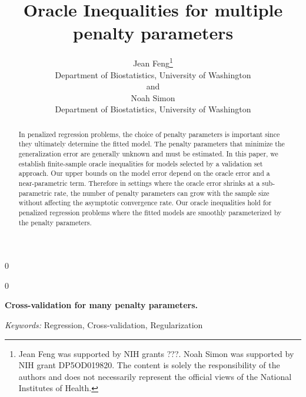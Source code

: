 \documentclass[12pt]{article}
\newcommand{\blind}{0}
\begin{document}
\def\spacingset#1{\renewcommand{\baselinestretch}%
{#1}\small\normalsize} \spacingset{1}



\blind
{
  \title{\bf Oracle Inequalities for multiple penalty parameters}
  \author{Jean Feng\thanks{
    Jean Feng was supported by NIH grants ???. %
    Noah Simon was supported by NIH grant DP5OD019820.
    The content is solely the responsibility of the authors and does not necessarily represent the official views of the National Institutes of Health.}\\
    Department of Biostatistics, University of Washington\\
    and \\
    Noah Simon \\
    Department of Biostatistics, University of Washington}
  \maketitle
} \fi

\blind
{
  \bigskip
  \bigskip
  \bigskip
  \begin{center}
    {\LARGE\bf Cross-validation for many penalty parameters.}
\end{center}
  \medskip
} \fi

\bigskip
\begin{abstract}

In penalized regression problems, the choice of penalty parameters is important since they ultimately determine the fitted model. The penalty parameters that minimize the generalization error are generally unknown and must be estimated. In this paper, we establish finite-sample oracle inequalities for models selected by a validation set approach. Our upper bounds on the model error depend on the oracle error and a near-parametric term. Therefore in settings where the oracle error shrinks at a sub-parametric rate, the number of penalty parameters can grow with the sample size without affecting the asymptotic convergence rate. Our oracle inequalities hold for penalized regression problems where the fitted models are smoothly parameterized by the penalty parameters. 

\end{abstract}

\noindent%
{\it Keywords:}  Regression, Cross-validation, Regularization
\vfill

\newpage
\spacingset{1.45}
\end{document}
